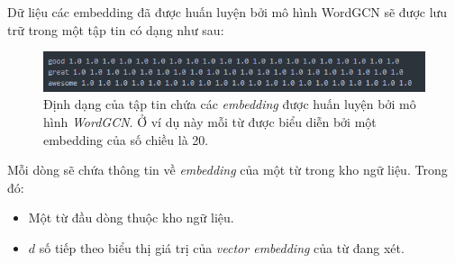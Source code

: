 Dữ liệu các embedding đã được huấn luyện bởi mô hình WordGCN sẽ được lưu trữ trong một tập tin có dạng như sau:

\begin{figure}[H]
    \begin{center}
        \includegraphics[scale=1]{images/pretrained-embedding}
        \caption{Định dạng của tập tin chứa các \textit{embedding} được huấn luyện bởi mô hình \textit{WordGCN}. Ở ví dụ này mỗi từ được biểu diễn bởi một embedding của số chiều là 20.}
        \label{fig:pretrained-embedding}
    \end{center}
\end{figure}

Mỗi dòng sẽ chứa thông tin về \textit{embedding} của một từ trong kho ngữ liệu. Trong đó:
\begin{itemize}
	\item Một từ đầu dòng thuộc kho ngữ liệu.
	\item $d$ số tiếp theo biểu thị giá trị của \textit{vector embedding} của từ đang xét.
\end{itemize}